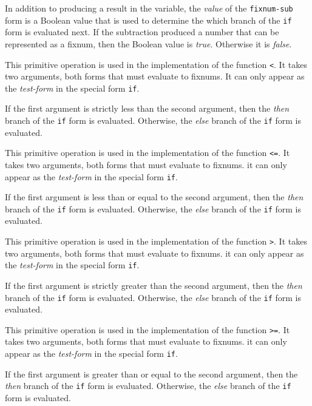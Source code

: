 In addition to producing a result in the variable, the \emph{value}
of the \texttt{fixnum-sub} form is a Boolean value that is used to
determine the which branch of the \texttt{if} form is evaluated next.
If the subtraction produced a number that can be represented as a
fixnum, then the Boolean value is \emph{true}.  Otherwise it is
\emph{false}.


This primitive operation is used in the implementation of the
\commonlisp{} function \texttt{<}.  It takes two arguments, both forms
that must evaluate to fixnums.  It can only appear as the
\emph{test-form} in the special form \texttt{if}.

If the first argument is strictly less than the second argument, then
the \emph{then} branch of the \texttt{if} form is evaluated.
Otherwise, the \emph{else} branch of the \texttt{if} form is
evaluated.


This primitive operation is used in the implementation of the
\commonlisp{} function \texttt{<=}.  It takes two arguments, both
forms that must evaluate to fixnums.  it can only appear as the
\emph{test-form} in the special form \texttt{if}.

If the first argument is less than or equal to the second argument,
then the \emph{then} branch of the \texttt{if} form is evaluated.
Otherwise, the \emph{else} branch of the \texttt{if} form is
evaluated.


This primitive operation is used in the implementation of the
\commonlisp{} function \texttt{>}.  It takes two arguments, both
forms that must evaluate to fixnums.  it can only appear as the
\emph{test-form} in the special form \texttt{if}.

If the first argument is strictly greater than the second argument,
then the \emph{then} branch of the \texttt{if} form is evaluated.
Otherwise, the \emph{else} branch of the \texttt{if} form is
evaluated.


This primitive operation is used in the implementation of the
\commonlisp{} function \texttt{>=}.  It takes two arguments, both
forms that must evaluate to fixnums.  it can only appear as the
\emph{test-form} in the special form \texttt{if}.

If the first argument is greater than or equal to the second argument,
then the \emph{then} branch of the \texttt{if} form is evaluated.
Otherwise, the \emph{else} branch of the \texttt{if} form is
evaluated.

